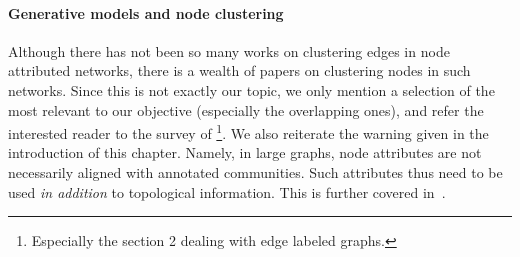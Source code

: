 \paragraph{Generative models and node clustering}
\label{par:erw_genmod}

Although there has not been so many works on clustering edges in node attributed networks, there is a
wealth of papers on clustering nodes in such networks. Since this is not exactly our topic, we only
mention a selection of the most relevant to our objective (especially the overlapping ones), and
refer the interested reader to the survey of
\textcite{surveyAttributedClustering15}\footnote{Especially the section 2 dealing with edge labeled
graphs.}. We also reiterate the warning given in the introduction of this chapter. Namely, in large graphs, node
attributes are not necessarily aligned with annotated communities. Such attributes thus need to be
used \emph{in addition} to topological information. This is further covered in~\autocite[Section
3.4]{Fortunato2016}.

